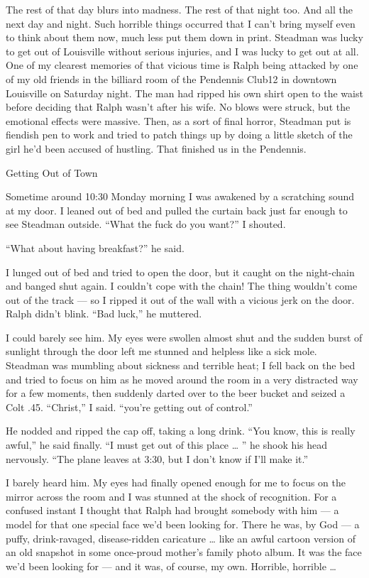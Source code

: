 \documentclass[10pt,a4paper]{article}
\begin{document}
The rest of that day blurs into madness. The rest of that night too. And all the next day and night. Such horrible things occurred that I can’t bring myself even to think about them now, much less put them down in print. Steadman was lucky to get out of Louisville without serious injuries, and I was lucky to get out at all. One of my clearest memories of that vicious time is Ralph being attacked by one of my old friends in the billiard room of the Pendennis Club12 in downtown Louisville on Saturday night. The man had ripped his own shirt open to the waist before deciding that Ralph wasn’t after his wife. No blows were struck, but the emotional effects were massive. Then, as a sort of final horror, Steadman put is fiendish pen to work and tried to patch things up by doing a little sketch of the girl he’d been accused of hustling. That finished us in the Pendennis.

Getting Out of Town

Sometime around 10:30 Monday morning I was awakened by a scratching sound at my door. I leaned out of bed and pulled the curtain back just far enough to see Steadman outside. “What the fuck do you want?” I shouted.

“What about having breakfast?” he said.

I lunged out of bed and tried to open the door, but it caught on the night-chain and banged shut again. I couldn’t cope with the chain! The thing wouldn’t come out of the track — so I ripped it out of the wall with a vicious jerk on the door. Ralph didn’t blink. “Bad luck,” he muttered.

I could barely see him. My eyes were swollen almost shut and the sudden burst of sunlight through the door left me stunned and helpless like a sick mole. Steadman was mumbling about sickness and terrible heat; I fell back on the bed and tried to focus on him as he moved around the room in a very distracted way for a few moments, then suddenly darted over to the beer bucket and seized a Colt .45. “Christ,” I said. “you’re getting out of control.”

He nodded and ripped the cap off, taking a long drink. “You know, this is really awful,” he said finally. “I must get out of this place … ” he shook his head nervously. “The plane leaves at 3:30, but I don’t know if I’ll make it.”

I barely heard him. My eyes had finally opened enough for me to focus on the mirror across the room and I was stunned at the shock of recognition. For a confused instant I thought that Ralph had brought somebody with him — a model for that one special face we’d been looking for. There he was, by God — a puffy, drink-ravaged, disease-ridden caricature … like an awful cartoon version of an old snapshot in some once-proud mother’s family photo album. It was the face we’d been looking for — and it was, of course, my own. Horrible, horrible …
\end{document}
